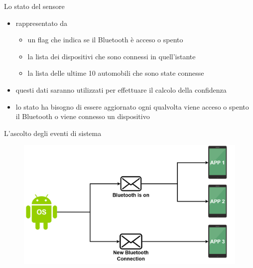\documentclass{beamer}
\begin{document}
\begin{frame}{Lo stato del sensore}
{\begin{itemize}
\item rappresentato da
    \begin{itemize}
        \item un flag che indica se il Bluetooth è acceso o spento
        \item la lista dei dispositivi che sono connessi in quell'istante
        \item la lista delle ultime 10 automobili che sono state connesse
    \end{itemize}
\item questi dati saranno utilizzati per effettuare il calcolo della confidenza
\item lo stato ha bisogno di essere aggiornato ogni qualvolta viene acceso o spento il Bluetooth o viene connesso un dispositivo
\end{itemize}
}
\end{frame}

\begin{frame}{L'ascolto degli eventi di sistema}
\vspace{-0.5cm}
\begin{figure}
    \centering
    \includegraphics[width=0.9\linewidth]{assets/system_broadcast.png}
\end{figure}
\end{frame}
\end{document}
